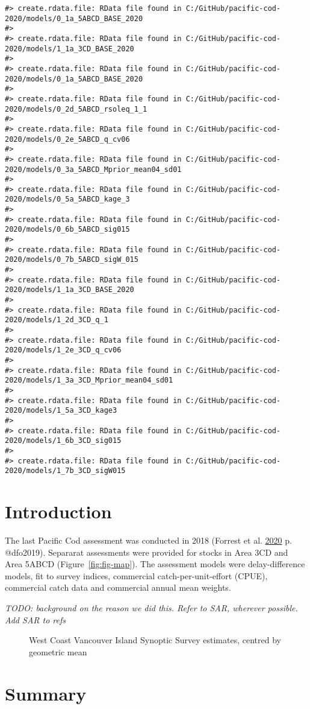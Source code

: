 \documentclass[11pt]{book}
\begin{document}
\frontmatter
\begin{verbatim}
#> create.rdata.file: RData file found in C:/GitHub/pacific-cod-2020/models/0_1a_5ABCD_BASE_2020
#> 
#> create.rdata.file: RData file found in C:/GitHub/pacific-cod-2020/models/1_1a_3CD_BASE_2020
#> 
#> create.rdata.file: RData file found in C:/GitHub/pacific-cod-2020/models/0_1a_5ABCD_BASE_2020
#> 
#> create.rdata.file: RData file found in C:/GitHub/pacific-cod-2020/models/0_2d_5ABCD_rsoleq_1_1
#> 
#> create.rdata.file: RData file found in C:/GitHub/pacific-cod-2020/models/0_2e_5ABCD_q_cv06
#> 
#> create.rdata.file: RData file found in C:/GitHub/pacific-cod-2020/models/0_3a_5ABCD_Mprior_mean04_sd01
#> 
#> create.rdata.file: RData file found in C:/GitHub/pacific-cod-2020/models/0_5a_5ABCD_kage_3
#> 
#> create.rdata.file: RData file found in C:/GitHub/pacific-cod-2020/models/0_6b_5ABCD_sig015
#> 
#> create.rdata.file: RData file found in C:/GitHub/pacific-cod-2020/models/0_7b_5ABCD_sigW_015
#> 
#> create.rdata.file: RData file found in C:/GitHub/pacific-cod-2020/models/1_1a_3CD_BASE_2020
#> 
#> create.rdata.file: RData file found in C:/GitHub/pacific-cod-2020/models/1_2d_3CD_q_1
#> 
#> create.rdata.file: RData file found in C:/GitHub/pacific-cod-2020/models/1_2e_3CD_q_cv06
#> 
#> create.rdata.file: RData file found in C:/GitHub/pacific-cod-2020/models/1_3a_3CD_Mprior_mean04_sd01
#> 
#> create.rdata.file: RData file found in C:/GitHub/pacific-cod-2020/models/1_5a_3CD_kage3
#> 
#> create.rdata.file: RData file found in C:/GitHub/pacific-cod-2020/models/1_6b_3CD_sig015
#> 
#> create.rdata.file: RData file found in C:/GitHub/pacific-cod-2020/models/1_7b_3CD_sigW015
\end{verbatim}
\clearpage

\hypertarget{introduction}{%
\section{Introduction}\label{introduction}}

The last Pacific Cod assessment was conducted in 2018 (Forrest et al. \protect\hyperlink{ref-forrest2020}{2020} p. @dfo2019). Separarat assessments were provided for stocks in Area 3CD and Area 5ABCD (Figure~\ref{fig:fig-map}). The assessment models were delay-difference models, fit to survey indices, commercial catch-per-unit-effort (CPUE), commercial catch data and commercial annual mean weights.

\emph{TODO: background on the reason we did this. Refer to SAR, wherever possible. Add SAR to refs}
\begin{figure}[htb]

{\centering {} 

}

\caption{West Coast Vancouver Island Synoptic Survey estimates, centred by geometric mean}\label{fig:fig-wcvi-index-3cd}
\end{figure}
\hypertarget{summary}{%
\section{Summary}\label{summary}}
\end{document}
